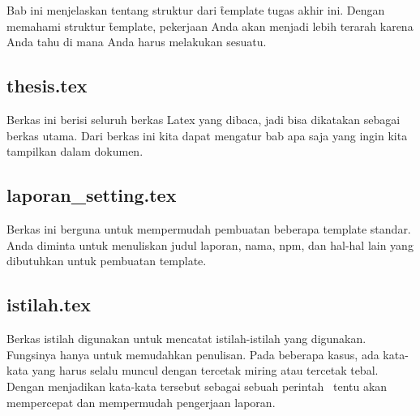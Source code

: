\chapter{\babEmpat}
Bab ini menjelaskan tentang struktur dari \f{template} tugas akhir ini.
Dengan memahami struktur \f{template}, pekerjaan Anda akan menjadi lebih terarah karena Anda tahu di mana Anda harus melakukan sesuatu.



\section{thesis.tex}
Berkas ini berisi seluruh berkas Latex yang dibaca, jadi bisa dikatakan sebagai berkas utama.
Dari berkas ini kita dapat mengatur bab apa saja yang ingin kita tampilkan dalam dokumen.


\section{laporan\_setting.tex}
Berkas ini berguna untuk mempermudah pembuatan beberapa template standar. 
Anda diminta untuk menuliskan judul laporan, nama, npm, dan hal-hal lain yang dibutuhkan untuk pembuatan template. 


\section{istilah.tex}
Berkas istilah digunakan untuk mencatat istilah-istilah yang digunakan. 
Fungsinya hanya untuk memudahkan penulisan.
Pada beberapa kasus, ada kata-kata yang harus selalu muncul dengan tercetak miring atau tercetak tebal. 
Dengan menjadikan kata-kata tersebut sebagai sebuah perintah \latex~tentu akan mempercepat dan mempermudah pengerjaan laporan. 


